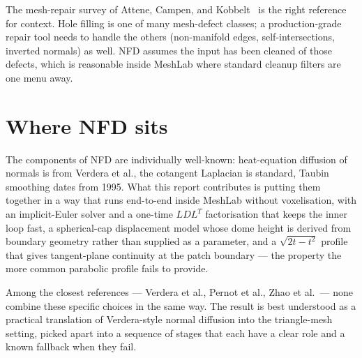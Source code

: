 The mesh-repair survey of Attene, Campen, and Kobbelt~\cite{attene2013} is the right reference for context. Hole filling is one of many mesh-defect classes; a production-grade repair tool needs to handle the others (non-manifold edges, self-intersections, inverted normals) as well. NFD assumes the input has been cleaned of those defects, which is reasonable inside MeshLab where standard cleanup filters are one menu away.

\section{Where NFD sits}

The components of NFD are individually well-known: heat-equation diffusion of normals is from Verdera et al., the cotangent Laplacian is standard, Taubin smoothing dates from 1995. What this report contributes is putting them together in a way that runs end-to-end inside MeshLab without voxelisation, with an implicit-Euler solver and a one-time $LDL^T$ factorisation that keeps the inner loop fast, a spherical-cap displacement model whose dome height is derived from boundary geometry rather than supplied as a parameter, and a $\sqrt{2t-t^2}$ profile that gives tangent-plane continuity at the patch boundary --- the property the more common parabolic profile fails to provide.

Among the closest references --- Verdera et al., Pernot et al., Zhao et al.\ --- none combine these specific choices in the same way. The result is best understood as a practical translation of Verdera-style normal diffusion into the triangle-mesh setting, picked apart into a sequence of stages that each have a clear role and a known fallback when they fail.
